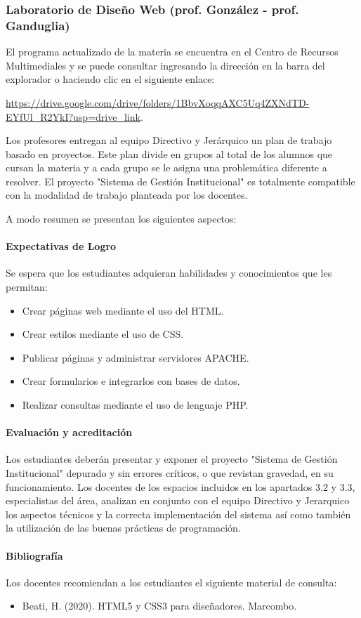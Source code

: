 \subsubsection{Laboratorio de Diseño Web (prof. González - prof. Ganduglia)}
El programa actualizado de la materia se encuentra en el Centro de Recursos Multimediales y se puede consultar ingresando la dirección en la barra del explorador o haciendo clic en el siguiente enlace:

\url{https://drive.google.com/drive/folders/1BbvXoqqAXC5Uq4ZXNdTD-EYfUl_R2YkI?usp=drive_link}.

Los profesores entregan al equipo Directivo y Jerárquico un plan de trabajo basado en proyectos. Este plan divide en grupos al total de los alumnos que cursan la materia y a cada grupo se le asigna una problemática diferente a resolver. El proyecto "Sistema de Gestión Institucional" es totalmente compatible con la modalidad de trabajo planteada por los docentes.

A modo resumen se presentan los siguientes aspectos:
\paragraph{Expectativas de Logro}
Se espera que los estudiantes adquieran habilidades y conocimientos que les permitan: 

\begin{itemize}
    \item Crear páginas web mediante el uso del HTML.
    \item Crear estilos mediante el uso de CSS.
    \item Publicar páginas y administrar servidores APACHE.
    \item Crear formularios e integrarlos con bases de datos.
    \item Realizar consultas mediante el uso de lenguaje PHP.

\end{itemize}

\paragraph{Evaluación y acreditación}

Los estudiantes deberán presentar y exponer el proyecto "Sistema de Gestión Institucional" depurado y sin errores críticos, o que revistan gravedad, en su funcionamiento. Los docentes de los espacios incluidos en los apartados 3.2 y 3.3, especialistas del área, analizan en conjunto con el equipo Directivo y Jerarquico los aspectos técnicos y la correcta implementación del sistema así como también la utilización de las buenas prácticas de programación.

\paragraph{Bibliografía} Los docentes recomiendan a los estudiantes el siguiente material de consulta:

\begin{itemize}
    \item Beati, H. (2020). HTML5 y CSS3 para diseñadores. Marcombo.
\end{itemize}
